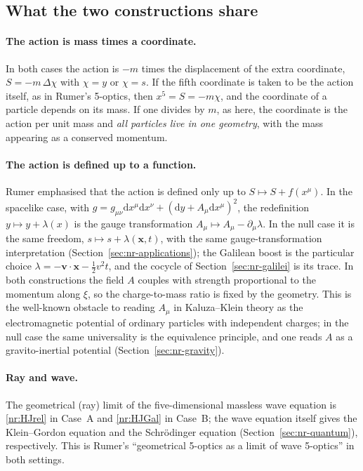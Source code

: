 \subsection{What the two constructions share}

\paragraph{The action is mass times a coordinate.}
In both cases the action is $-m$ times the displacement of the extra coordinate,
$S=-m\,\Delta\chi$ with $\chi=y$ or $\chi=s$. If the fifth coordinate
is taken to be the action itself, as in Rumer's 5-optics, then $x^5=S=-m\chi$,
and the coordinate of a particle depends on its mass. If one divides
by $m$, as here, the coordinate is the action per unit mass and \emph{all
particles live in one geometry}, with the mass appearing as a conserved
momentum.

\paragraph{The action is defined up to a function.}
Rumer emphasised that the action is defined only up to $S\mapsto S+f(x^\mu)$.
In the spacelike case, with $g=g_{\mu\nu}\mathrm{d}x^\mu\mathrm{d}x^\nu+(\mathrm{d}y+A_\mu\mathrm{d}x^\mu)^2$,
the redefinition $y\mapsto y+\lambda(x)$ is the gauge transformation
$A_\mu\mapsto A_\mu-\partial_\mu\lambda$. In the null case it is the same
freedom, $s\mapsto s+\lambda(\mathbf{x},t)$, with the same gauge-transformation
interpretation (Section~\ref{sec:nr-applications}); the Galilean boost is the
particular choice $\lambda=-\mathbf{v}\cdot\mathbf{x}-\tfrac12v^2t$, and the
cocycle of Section~\ref{sec:nr-galilei} is its trace.
In both constructions the field $A$ couples with strength proportional to the
momentum along $\xi$, so the charge-to-mass ratio is fixed by the geometry. This
is the well-known obstacle to reading $A_\mu$ in Kaluza--Klein theory as the
electromagnetic potential of ordinary particles with independent charges; in
the null case the same universality is the equivalence principle, and one reads
$A$ as a gravito-inertial potential (Section~\ref{sec:nr-gravity}).

\paragraph{Ray and wave.}
The geometrical (ray) limit of the five-dimensional massless wave equation is
\eqref{nr:HJrel} in Case~A and \eqref{nr:HJGal} in Case~B; the wave equation
itself gives the Klein--Gordon equation and the Schr\"odinger equation
(Section~\ref{sec:nr-quantum}), respectively. This is Rumer's ``geometrical 5-optics
as a limit of wave 5-optics'' in both settings.

